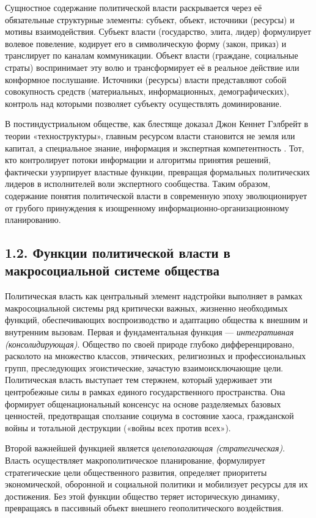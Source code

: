 Сущностное содержание политической власти раскрывается через её обязательные структурные элементы: субъект, объект, источники (ресурсы) и мотивы взаимодействия. Субъект власти (государство, элита, лидер) формулирует волевое повеление, кодирует его в символическую форму (закон, приказ) и транслирует по каналам коммуникации. Объект власти (граждане, социальные страты) воспринимает эту волю и трансформирует её в реальное действие или конформное послушание. Источники (ресурсы) власти представляют собой совокупность средств (материальных, информационных, демографических), контроль над которыми позволяет субъекту осуществлять доминирование. 

В постиндустриальном обществе, как блестяще доказал Джон Кеннет Гэлбрейт в теории «техноструктуры», главным ресурсом власти становится не земля или капитал, а специальное знание, информация и экспертная компетентность \cite{Gelbreyt}. Тот, кто контролирует потоки информации и алгоритмы принятия решений, фактически узурпирует властные функции, превращая формальных политических лидеров в исполнителей воли экспертного сообщества. Таким образом, содержание понятия политической власти в современную эпоху эволюционирует от грубого принуждения к изощренному информационно-организационному планированию.

\subsection{1.2. Функции политической власти в макросоциальной системе общества}

Политическая власть как центральный элемент надстройки выполняет в рамках макросоциальной системы ряд критически важных, жизненно необходимых функций, обеспечивающих воспроизводство и адаптацию общества к внешним и внутренним вызовам. Первая и фундаментальная функция — \textit{интегративная (консолидирующая)}. Общество по своей природе глубоко дифференцировано, расколото на множество классов, этнических, религиозных и профессиональных групп, преследующих эгоистические, зачастую взаимоисключающие цели. Политическая власть выступает тем стержнем, который удерживает эти центробежные силы в рамках единого государственного пространства. Она формирует общенациональный консенсус на основе разделяемых базовых ценностей, предотвращая сползание социума в состояние хаоса, гражданской войны и тотальной деструкции («войны всех против всех»).

Второй важнейшей функцией является \textit{целеполагающая (стратегическая)}. Власть осуществляет макрополитическое планирование, формулирует стратегические цели общественного развития, определяет приоритеты экономической, оборонной и социальной политики и мобилизует ресурсы для их достижения. Без этой функции общество теряет историческую динамику, превращаясь в пассивный объект внешнего геополитического воздействия. 


